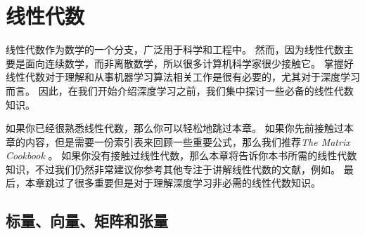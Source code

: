\chapter{线性代数}
\label{chap:linear_algebra}

线性代数作为数学的一个分支，广泛用于科学和工程中。
然而，因为线性代数主要是面向连续数学，而非离散数学，所以很多计算机科学家很少接触它。
掌握好线性代数对于理解和从事机器学习算法相关工作是很有必要的，尤其对于深度学习而言。
因此，在我们开始介绍深度学习之前，我们集中探讨一些必备的线性代数知识。


如果你已经很熟悉线性代数，那么你可以轻松地跳过本章。
如果你先前接触过本章的内容，但是需要一份索引表来回顾一些重要公式，那么我们推荐\emph{The Matrix Cookbook} \citep{matrix-cookbook}。
如果你没有接触过线性代数，那么本章将告诉你本书所需的线性代数知识，不过我们仍然非常建议你参考其他专注于讲解线性代数的文献，例如\cite{shilov1977linear}。
最后，本章跳过了很多重要但是对于理解深度学习非必需的线性代数知识。




\section{标量、向量、矩阵和张量}
\label{sec:scalars_vectors_matrices_and_tensors}


